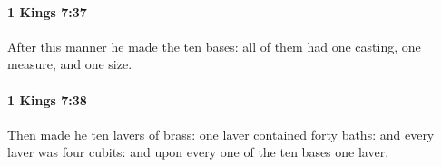 		\paragraph{1 Kings 7:37} %
			\label{1KINGS-7-37}

			After this manner he made the ten bases: all of them had one casting, one measure, and one size.


		\paragraph{1 Kings 7:38} %
			\label{1KINGS-7-38}

			Then made he ten lavers of brass: one laver contained forty baths: and every laver was four cubits: and upon every one of the ten bases one laver.


